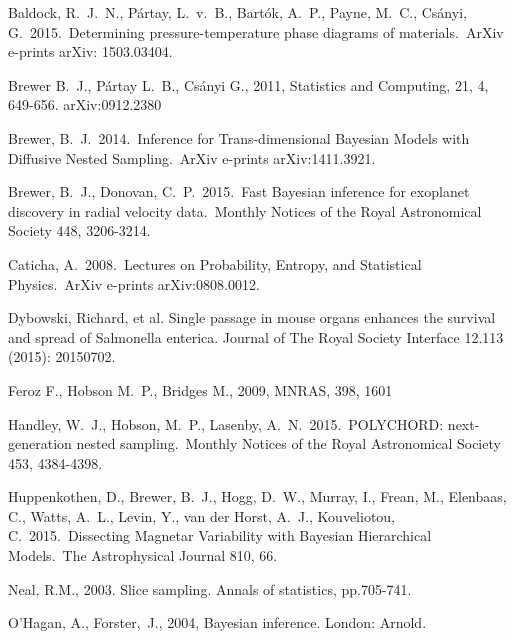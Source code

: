 \documentclass[article]{jss}
\begin{document}
\begin{thebibliography}{99}
 Baldock, R.~J.~N., 
P{\'a}rtay, L.~v.~B., Bart{\'o}k, A.~P., Payne, M.~C., Cs{\'a}nyi, G.\ 
2015.\ Determining pressure-temperature phase diagrams of materials.\ ArXiv 
e-prints arXiv: 1503.03404. 

 Brewer B.~J., P{\'a}rtay L.~B., Cs{\'a}nyi G., 2011,
Statistics and Computing, 21, 4, 649-656. arXiv:0912.2380

 Brewer, B.~J.\ 2014.\ Inference for Trans-dimensional Bayesian Models with Diffusive Nested Sampling.\ ArXiv e-prints arXiv:1411.3921.

 Brewer, B.~J., Donovan, C.~P.\ 2015.\ Fast Bayesian inference for exoplanet discovery in radial velocity data.\ Monthly Notices of the Royal Astronomical Society 448, 3206-3214. 

 Caticha, A.\ 2008.\ Lectures 
on Probability, Entropy, and Statistical Physics.\ ArXiv e-prints 
arXiv:0808.0012.

Dybowski, Richard, et al. Single passage in mouse organs enhances the survival and spread of Salmonella enterica. Journal of The Royal Society Interface 12.113 (2015): 20150702.

 Feroz F., Hobson M.~P., Bridges M., 2009, MNRAS, 398, 1601

 Handley, W.~J., Hobson, M.~P., Lasenby, A.~N.\ 2015.\ POLYCHORD: next-generation nested sampling.\ Monthly Notices of the Royal Astronomical Society 453, 4384-4398. 

 Huppenkothen, D., Brewer, B.~J., Hogg, D.~W., Murray, I., Frean, M., Elenbaas, C., Watts, A.~L., Levin, Y., van der Horst, A.~J., Kouveliotou, C.\ 2015.\ Dissecting Magnetar Variability with Bayesian Hierarchical Models.\ The Astrophysical Journal 810, 66. 

Neal, R.M., 2003. Slice sampling. Annals of statistics, pp.705-741.

O'Hagan, A., Forster,~J., 2004, Bayesian inference. London: Arnold.


\end{thebibliography}
\end{document}
